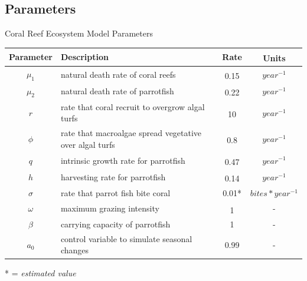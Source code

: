 \documentclass{beamer}
\begin{document}
\subsection{Parameters}
\begin{frame}{Coral Reef Ecosystem Model Parameters}
    \begin{table}
    \vspace{-.7cm}
    \begin{tabular}{c p{5cm} c c}
        \hline
        Parameter & Description & Rate & Units\textsuperscript{\cite{12_noaa_report}\cite{04_mathanalysis}\cite{13_blackwood_hastings_mumby_2010}}\\
        \hline
        \hline
        $\mu_{1}$ & natural death rate of coral reefs & 0.15\textsuperscript{\cite{16_wolanski_richmond_mccook_2004}} & $year^{-1}$\\ %
        $\mu_{2}$ & natural death rate of parrotfish & 0.22\textsuperscript{\cite{12_noaa_report}} & $year^{-1}$\\ %
        $r$ & rate that coral recruit to overgrow algal turfs & 10\textsuperscript{\cite{16_wolanski_richmond_mccook_2004}} & $year^{-1}$\\ %
        $\phi$ & rate that macroalgae spread vegetative over algal turfs & 0.8\textsuperscript{\cite{11_zikkah_anggriani_supriatna_2020}} & $year^{-1}$\\ %
        $q$ & intrinsic growth rate for parrotfish & 0.47\textsuperscript{\cite{12_noaa_report}} & $year^{-1}$\\ %
        $h$ & harvesting rate for parrotfish & 0.14\textsuperscript{\cite{12_noaa_report}} & $year^{-1}$\\ %
        $\sigma$ & rate that parrot fish bite coral & 0.01*& $bites*year^{-1}$\\
        $\omega$ & maximum grazing intensity & 1\textsuperscript{\cite{13_blackwood_hastings_mumby_2010}} & -\\
        $\beta$ & carrying capacity of parrotfish & 1 & -\\
        $a_{0}$ & control variable to simulate seasonal changes & 0.99 & - %
    \end{tabular}
\end{table}
* = \textit{estimated value}
\end{frame}
\end{document}
